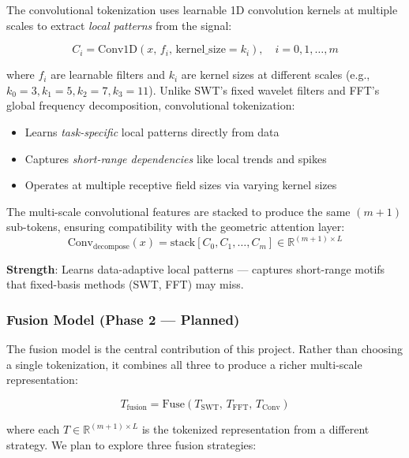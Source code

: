 \documentclass[12pt,a4paper]{article}
\begin{document}
The convolutional tokenization uses learnable 1D convolution kernels at multiple scales to extract \textit{local patterns} from the signal:

\begin{equation}
  C_i = \text{Conv1D}(x, \, f_i, \, \text{kernel\_size} = k_i), \quad i = 0, 1, \ldots, m
\end{equation}

where $f_i$ are learnable filters and $k_i$ are kernel sizes at different scales (e.g., $k_0=3, k_1=5, k_2=7, k_3=11$). Unlike SWT's fixed wavelet filters and FFT's global frequency decomposition, convolutional tokenization:
\begin{itemize}[noitemsep]
  \item Learns \textit{task-specific} local patterns directly from data
  \item Captures \textit{short-range dependencies} like local trends and spikes
  \item Operates at multiple receptive field sizes via varying kernel sizes
\end{itemize}

The multi-scale convolutional features are stacked to produce the same $(m{+}1)$ sub-tokens, ensuring compatibility with the geometric attention layer:
\begin{equation}
  \text{Conv}_\text{decompose}(x) = \text{stack}[C_0, C_1, \ldots, C_m] \in \mathbb{R}^{(m+1) \times L}
\end{equation}

\textbf{Strength}: Learns data-adaptive local patterns --- captures short-range motifs that fixed-basis methods (SWT, FFT) may miss.

\subsubsection{Fusion Model (Phase 2 --- Planned)}
\label{sec:fusion}

The fusion model is the central contribution of this project. Rather than choosing a single tokenization, it combines all three to produce a richer multi-scale representation:

\begin{equation}
  T_\text{fusion} = \text{Fuse}\left(T_\text{SWT}, \, T_\text{FFT}, \, T_\text{Conv}\right)
\end{equation}

where each $T \in \mathbb{R}^{(m+1) \times L}$ is the tokenized representation from a different strategy. We plan to explore three fusion strategies:
\end{document}
